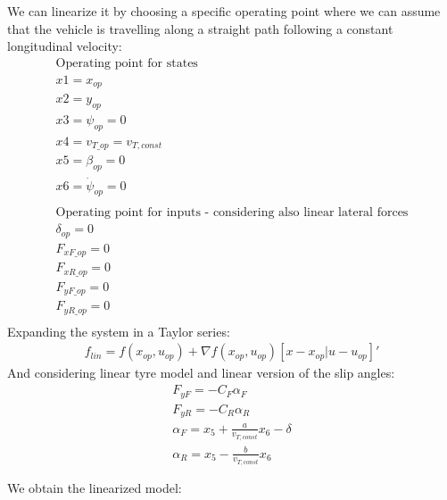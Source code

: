 \documentclass{report}
\begin{document}
We can linearize it by choosing a specific operating point where we can assume that the vehicle is travelling along a straight path following a constant longitudinal velocity:
\begin{equation}
\begin{aligned}
\text{Operating point for states}\\
x1 = x_{op}\\
x2 = y_{op}\\
x3 = \psi_{op} = 0\\
x4 = v_{T\_op} = v_{T, const}\\
x5 = \beta_{op} = 0\\
x6 = \dot{\psi}_{op} = 0\\\\
\text{Operating point for inputs - considering also linear lateral forces}\\
\delta_{op} = 0\\
F_{xF\_op} = 0\\
F_{xR\_op} = 0\\
F_{yF\_op} = 0\\
F_{yR\_op} = 0\\
\end{aligned}
\end{equation}
Expanding the system in a Taylor series:
\begin{equation}
\begin{aligned}
f_{lin} = f(x_{op},u_{op}) + \nabla f(x_{op},u_{op}) [x - x_{op}  |  u - u_{op}]'
\end{aligned}
\end{equation}
And considering linear tyre model and linear version of the slip angles:
\begin{equation}
\begin{aligned}
F_{yF} = -C_F \alpha_F\\
F_{yR} = -C_R \alpha_R\\
\alpha_F = x_5 + \frac{a}{v_{T, const}}x_6 - \delta\\
\alpha_R = x_5 - \frac{b}{v_{T, const}}x_6 \\\\
\end{aligned}
\end{equation}
We obtain the linearized model:
\end{document}
